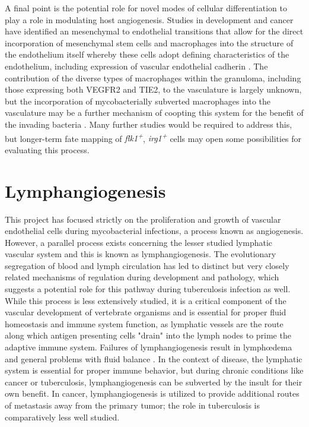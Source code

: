 A final point is the potential role for novel modes of cellular differentiation to play a role in modulating host angiogenesis. Studies in development and cancer have identified an mesenchymal to endothelial transitions that allow for the direct incorporation of mesenchymal stem cells and macrophages into the structure of the endothelium itself whereby these cells adopt defining characteristics of the endothelium, including expression of vascular endothelial cadherin \citep{Ubil2014, Wu2007, Zhang2008b}. The contribution of the diverse types of macrophages within the granuloma, including those expressing both VEGFR2 and TIE2, to the vasculature is largely unknown, but the incorporation of mycobacterially subverted macrophages into the vasculature may be a further mechanism of coopting this system for the benefit of the invading bacteria \citep{deCortie2014, Hall2012}. Many further studies would be required to address this, but longer-term fate mapping of \textit{flk1\textsuperscript{+}}, \textit{irg1\textsuperscript{+}} cells may open some possibilities for evaluating this process.

\section{Lymphangiogenesis}

This project has focused strictly on the proliferation and growth of vascular endothelial cells during mycobacterial infections, a process known as angiogenesis. However, a parallel process exists concerning the lesser studied lymphatic vascular system and this is known as lymphangiogenesis. The evolutionary segregation of blood and lymph circulation has led to distinct but very closely related mechanisms of regulation during development and pathology, which suggests a potential role for this pathway during tuberculosis infection as well. While this process is less extensively studied, it is a critical component of the vascular development of vertebrate organisms and is essential for proper fluid homeostasis and immune system function, as lymphatic vessels are the route along which antigen presenting cells "drain" into the lymph nodes to prime the adaptive immune system. Failures of lymphangiogenesis result in lymph\oe dema and general problems with fluid balance \citep{Makinen2001}. In the context of disease, the lymphatic system is essential for proper immune behavior, but during chronic conditions like cancer or tuberculosis, lymphangiogenesis can be subverted by the insult for their own benefit. In cancer, lymphangiogenesis is utilized to provide additional routes of metastasis away from the primary tumor; the role in tuberculosis is comparatively less well studied.

